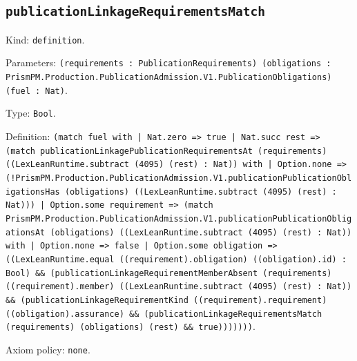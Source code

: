 \documentclass[11pt]{article}
\begin{document}
\subsection*{\texttt{publicationLinkageRequirementsMatch}}
\noindent Kind: \texttt{definition}.\par
\noindent Parameters: \texttt{(requirements : PublicationRequirements) (obligations : PrismPM.Production.PublicationAdmission.V1.PublicationObligations) (fuel : Nat)}.\par
\noindent Type: \texttt{Bool}.\par
\noindent Definition: \texttt{(match fuel with | Nat.zero => true | Nat.succ rest => (match publicationLinkagePublicationRequirementsAt (requirements) ((LexLeanRuntime.subtract (4095) (rest) : Nat)) with | Option.none => (!PrismPM.Production.PublicationAdmission.V1.publicationPublicationObligationsHas (obligations) ((LexLeanRuntime.subtract (4095) (rest) : Nat))) | Option.some requirement => (match PrismPM.Production.PublicationAdmission.V1.publicationPublicationObligationsAt (obligations) ((LexLeanRuntime.subtract (4095) (rest) : Nat)) with | Option.none => false | Option.some obligation => ((LexLeanRuntime.equal ((requirement).obligation) ((obligation).id) : Bool) \&\& (publicationLinkageRequirementMemberAbsent (requirements) ((requirement).member) ((LexLeanRuntime.subtract (4095) (rest) : Nat)) \&\& (publicationLinkageRequirementKind ((requirement).requirement) ((obligation).assurance) \&\& (publicationLinkageRequirementsMatch (requirements) (obligations) (rest) \&\& true)))))))}.\par
\noindent Axiom policy: \texttt{none}.\par
\end{document}
